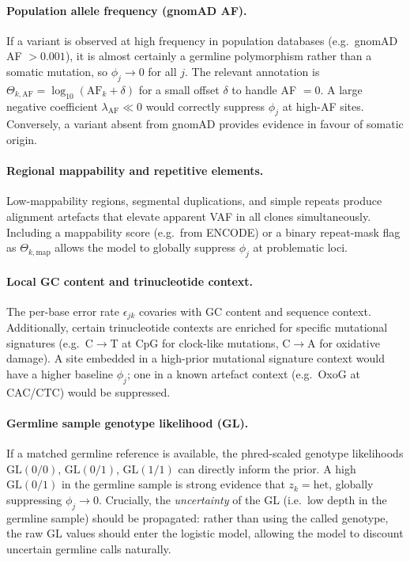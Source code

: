\documentclass{article}
\begin{document}
\paragraph{Population allele frequency (gnomAD AF).}
If a variant is observed at high frequency in population databases (e.g.\
gnomAD AF $> 0.001$), it is almost certainly a germline polymorphism rather
than a somatic mutation, so $\phi_j \to 0$ for all $j$.  The relevant
annotation is $\Theta_{k,\mathrm{AF}} = \log_{10}(\mathrm{AF}_k + \delta)$ for
a small offset $\delta$ to handle AF $= 0$.  A large negative coefficient
$\lambda_\mathrm{AF} \ll 0$ would correctly suppress $\phi_j$ at high-AF
sites.  Conversely, a variant absent from gnomAD provides evidence in favour of
somatic origin.

\paragraph{Regional mappability and repetitive elements.}
Low-mappability regions, segmental duplications, and simple repeats produce
alignment artefacts that elevate apparent VAF in all clones simultaneously.
Including a mappability score (e.g.\ from ENCODE) or a binary repeat-mask flag
as $\Theta_{k,\mathrm{map}}$ allows the model to globally suppress $\phi_j$
at problematic loci.

\paragraph{Local GC content and trinucleotide context.}
The per-base error rate $\epsilon_{jk}$ covaries with GC content and
sequence context.  Additionally, certain trinucleotide contexts are enriched
for specific mutational signatures (e.g.\ C$\to$T at CpG for clock-like
mutations, C$\to$A for oxidative damage).  A site embedded in a high-prior
mutational signature context would have a higher baseline $\phi_j$; one in a
known artefact context (e.g.\ OxoG at CAC/CTC) would be suppressed.

\paragraph{Germline sample genotype likelihood (GL).}
If a matched germline reference is available, the phred-scaled genotype
likelihoods $\mathrm{GL}(0/0)$, $\mathrm{GL}(0/1)$, $\mathrm{GL}(1/1)$ can
directly inform the prior.  A high $\mathrm{GL}(0/1)$ in the germline sample is
strong evidence that $z_k = \mathrm{het}$, globally suppressing $\phi_j \to
0$.  Crucially, the \emph{uncertainty} of the GL (i.e.\ low depth in the
germline sample) should be propagated: rather than using the called genotype,
the raw GL values should enter the logistic model, allowing the model to
discount uncertain germline calls naturally.
\end{document}
